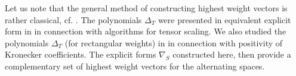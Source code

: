 \documentclass[12pt, reqno]{amsart}
\newtheorem{theorem}{Theorem}[section]
\theoremstyle{definition}
\newtheorem{remark}{Remark}[section]
\let\oldbigwedge\bigwedge
\let\oldbigvee\bigvee
\renewcommand{\bigwedge}{
  \mathop{
    \vcenter{
      \hbox{\scalebox{0.9}{$\displaystyle\oldbigwedge$}}
    }
  }
}
\renewcommand{\bigvee}{
  \mathop{
    \vcenter{
      \hbox{\scalebox{0.9}{$\displaystyle\oldbigvee$}}
    }
  }
}
\begin{document}




\vspace{0.5em}

Let us note that the general method of constructing highest weight vectors is rather classical, cf. \cite{processi, bi13, widg, widg1}. The polynomials $\Delta_T$ were presented in equivalent explicit form in \cite{widg1} in connection with algorithms for tensor scaling. %
We also studied the polynomials $\Delta_T$ (for rectangular weights) in \cite{ayfund} in connection with positivity of Kronecker coefficients. The explicit forms $\nabla_S$ constructed here, then provide a complementary set of highest weight vectors for the alternating spaces. 
\end{document}
